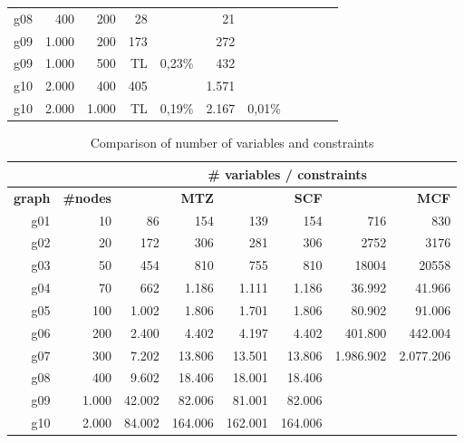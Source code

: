 \documentclass{article}
\begin{document}
\begin{table}[htbp]
\begin{tabular}{rrr|rr|rr|rr|rr}
			g08   & 400   & 200   & 28    &       & 21    &       &       &       &       &  \\
			g09   & 1.000 & 200   & 173   &       & 272   &       &       &       &       &  \\
			g09   & 1.000 & 500   & TL    & 0,23\% & 432   &       &       &       &       &  \\
			g10   & 2.000 & 400   & 405   &       & 1.571 &       &       &       &       &  \\
			g10   & 2.000 & 1.000 & TL    & 0,19\% & 2.167 & 0,01\% &       &       &       &  \\
		\end{tabular}%
		\label{tab:runtime}%
	\end{table}%

	
	\begin{table}[htbp]
		\centering
		\caption{Comparison of number of variables and constraints}
		\begin{tabular}{rr|rr|rr|rr}
			&       & \multicolumn{6}{c}{\# variables / constraints} \\
			\midrule
			\multicolumn{1}{p{3.5em}}{\textbf{graph}} & \multicolumn{1}{p{3.5em}|}{\textbf{\#nodes}} & \multicolumn{2}{p{9em}|}{\textbf{MTZ}} & \multicolumn{2}{p{9em}|}{\textbf{SCF}} & \multicolumn{2}{p{9em}}{\textbf{MCF}} \\
			\midrule
			g01   & 10    & 86    & 154   & 139   & 154   & 716   & 830 \\
			g02   & 20    & 172   & 306   & 281   & 306   & 2752  & 3176 \\
			g03   & 50    & 454   & 810   & 755   & 810   & 18004 & 20558 \\
			g04   & 70    & 662   & 1.186 & 1.111 & 1.186 & 36.992 & 41.966 \\
			g05   & 100   & 1.002 & 1.806 & 1.701 & 1.806 & 80.902 & 91.006 \\
			g06   & 200   & 2.400 & 4.402 & 4.197 & 4.402 & 401.800 & 442.004 \\
			g07   & 300   & 7.202 & 13.806 & 13.501 & 13.806 & 1.986.902 & 2.077.206 \\
			g08   & 400   & 9.602 & 18.406 & 18.001 & 18.406 &       &  \\
			g09   & 1.000 & 42.002 & 82.006 & 81.001 & 82.006 &       &  \\
			g10   & 2.000 & 84.002 & 164.006 & 162.001 & 164.006 &       &  \\
		\end{tabular}%
		\label{tab:vars_cons}%
	\end{table}%
	
\end{document}

